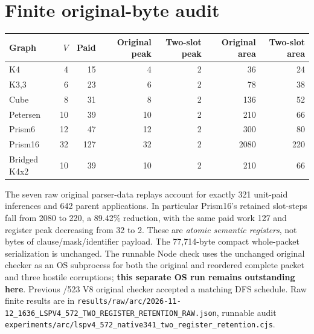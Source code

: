 \documentclass[11pt]{article}
\begin{document}
\section*{Finite original-byte audit}
\begin{center}
\begin{tabular}{lrrrrrr}
\toprule
Graph & $V$ & Paid & Original peak & Two-slot peak & Original area & Two-slot area\\
\midrule
K4 &4&15&4&2&36&24\\
K3,3 &6&23&6&2&78&38\\
Cube &8&31&8&2&136&52\\
Petersen &10&39&10&2&210&66\\
Prism6 &12&47&12&2&300&80\\
Prism16 &32&127&32&2&2080&220\\
Bridged K4x2 &10&39&10&2&210&66\\
\bottomrule
\end{tabular}
\end{center}
The seven raw original parser-data replays account for exactly 321 unit-paid inferences and 642 parent applications. In particular Prism16's retained slot-steps fall from 2080 to 220, a 89.42\% reduction, with the same paid work 127 and register peak decreasing from 32 to 2. These are \emph{atomic semantic registers}, not bytes of clause/mask/identifier payload. The 77,714-byte compact whole-packet serialization is unchanged. The runnable Node check uses the unchanged original checker as an OS subprocess for both the original and reordered complete packet and three hostile corruptions; \textbf{this separate OS run remains outstanding here}. Previous /523 V8 original checker accepted a matching DFS schedule. Raw finite results are in \texttt{results/raw/arc/2026-11-12\_1636\_LSPV4\_572\_TWO\_REGISTER\_RETENTION\_RAW.json}, runnable audit \texttt{experiments/arc/lspv4\_572\_native341\_two\_register\_retention.cjs}.
\end{document}
